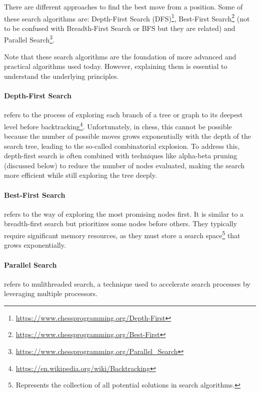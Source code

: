 There are different approaches to find the best move from a position. Some of these search algorithms are: Depth-First Search (DFS)\footnote{\url{https://www.chessprogramming.org/Depth-First}}, Best-First Search\footnote{\url{https://www.chessprogramming.org/Best-First}} (not to be confused with Breadth-First Search or BFS but they are related) and Parallel Search\footnote{\url{https://www.chessprogramming.org/Parallel_Search}}.

\vspace{1em}

\noindent Note that these search algorithms are the foundation of more advanced and practical algorithms used today. However, explaining them is essential to understand the underlying principles.

\paragraph{Depth-First Search} refers to the process of exploring each branch of a tree or graph to its deepest level before backtracking\footnote{\url{https://en.wikipedia.org/wiki/Backtracking}}. Unfortunately, in chess, this cannot be possible because the number of possible moves grows exponentially with the depth of the search tree, leading to the so-called combinatorial explosion. To address this, depth-first search is often combined with techniques like alpha-beta pruning (discussed below) to reduce the number of nodes evaluated, making the search more efficient while still exploring the tree deeply.

\paragraph{Best-First Search} refers to the way of exploring the most promising nodes first. It is similar to a breadth-first search but prioritizes some nodes before others. They typically require significant memory resources, as they must store a search space\footnote{Represents the collection of all potential solutions in search algorithms.} that grows exponentially.

\paragraph{Parallel Search} refers to mulithreaded search, a technique used to accelerate search processes by leveraging multiple processors.

\vspace{1em}


